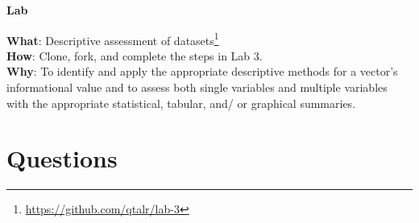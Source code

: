 \documentclass[
  letterpaper,
  DIV=11,
  numbers=noendperiod]{scrreport}
\theoremstyle{definition}
\theoremstyle{remark}
\DeclareRobustCommand{\href}[2]{#2\footnote{\url{#1}}}
\begin{document}
\begin{tcolorbox}[enhanced jigsaw, breakable, colback=white, rightrule=.15mm, arc=.35mm, left=2mm, toprule=.15mm, leftrule=.75mm, bottomrule=.15mm, opacityback=0]

\textbf{ Lab}

\textbf{What}: \href{https://github.com/qtalr/lab-3}{Descriptive
assessment of datasets}\\
\textbf{How}: Clone, fork, and complete the steps in Lab 3.\\
\textbf{Why}: To identify and apply the appropriate descriptive methods
for a vector's informational value and to assess both single variables
and multiple variables with the appropriate statistical, tabular, and/
or graphical summaries.

\end{tcolorbox}

\hypertarget{questions-2}{%
\section*{Questions}\label{questions-2}}

\end{document}
